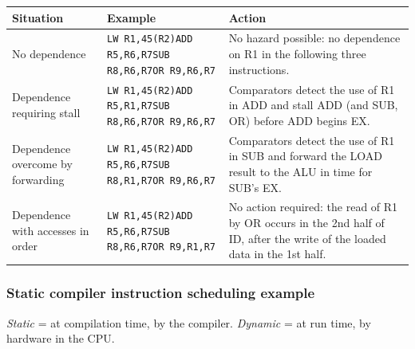 \begin{center}
\begin{tabular}{@{}p{3.4cm}p{4.3cm}p{5.6cm}@{}}
\toprule
Situation & Example & Action \\
\midrule
No dependence &
\texttt{LW R1,45(R2)}\newline\texttt{ADD R5,R6,R7}\newline\texttt{SUB R8,R6,R7}\newline\texttt{OR R9,R6,R7} &
No hazard possible: no dependence on R1 in the following three instructions.\\[4pt]
Dependence requiring stall &
\texttt{LW R1,45(R2)}\newline\texttt{ADD R5,R1,R7}\newline\texttt{SUB R8,R6,R7}\newline\texttt{OR R9,R6,R7} &
Comparators detect the use of R1 in ADD and stall ADD (and SUB, OR) before ADD begins EX.\\[4pt]
Dependence overcome by forwarding &
\texttt{LW R1,45(R2)}\newline\texttt{ADD R5,R6,R7}\newline\texttt{SUB R8,R1,R7}\newline\texttt{OR R9,R6,R7} &
Comparators detect the use of R1 in SUB and forward the LOAD result to the ALU in time for SUB's EX.\\[4pt]
Dependence with accesses in order &
\texttt{LW R1,45(R2)}\newline\texttt{ADD R5,R6,R7}\newline\texttt{SUB R8,R6,R7}\newline\texttt{OR R9,R1,R7} &
No action required: the read of R1 by OR occurs in the 2nd half of ID, after the write of the loaded data in the 1st half.\\
\bottomrule
\end{tabular}
\end{center}

\subsubsection{Static compiler instruction scheduling example}

\begin{note}
\emph{Static} = at compilation time, by the compiler. \emph{Dynamic} = at
run time, by hardware in the CPU.
\end{note}

